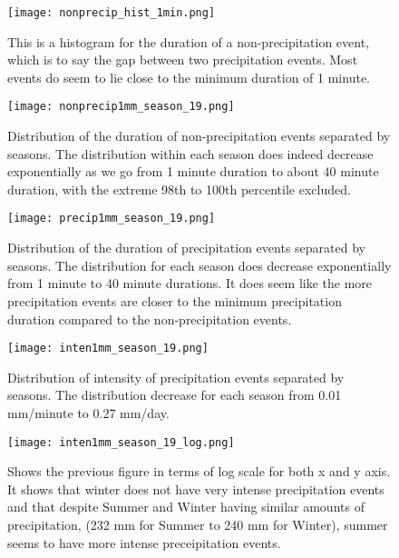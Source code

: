 \documentclass[12pt]{article}
\begin{document}
\begin{figure}[h]
	\centering
	\texttt{[image: nonprecip\_hist\_1min.png]}
	\caption{This is a histogram for the duration of a non-precipitation event, which is to say the gap between two precipitation events. Most events do seem to lie close to the minimum duration of 1 minute. }
\end{figure}
\begin{figure}[h]
	\centering
	\texttt{[image: nonprecip1mm\_season\_19.png]}
	\caption{Distribution of the duration of non-precipitation events separated by seasons. The distribution within each season does indeed decrease exponentially as we go from 1 minute duration to about 40 minute duration, with the extreme 98th to 100th percentile excluded.}
\end{figure}
\begin{figure}[h]
	\centering
	\texttt{[image: precip1mm\_season\_19.png]}
	\caption{Distribution of the duration of precipitation events separated by seasons. The distribution for each season does decrease exponentially from 1 minute to 40 minute durations. It does seem like the more precipitation events are closer to the minimum precipitation duration compared to the non-precipitation events.}
\end{figure}
\begin{figure}[h]
	\centering
	\texttt{[image: inten1mm\_season\_19.png]}
	\caption{Distribution of intensity of precipitation events separated by seasons. The distribution decrease for each season from 0.01 mm/minute to 0.27 mm/day.  }
\end{figure}
\begin{figure}[h]
	\centering
	\texttt{[image: inten1mm\_season\_19\_log.png]}
	\caption{Shows the previous figure in terms of log scale for both x and y axis. It shows that winter does not have very intense precipitation events and that despite Summer and Winter having similar amounts of precipitation, (232 mm for Summer to 240 mm for Winter), summer seems to have more intense preceipitation events.}
\end{figure}
\end{document}
